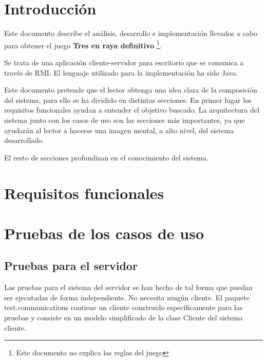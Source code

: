 \documentclass[a4paper,11pt,oneside]{article}
\begin{document}

\clearpage
\section{Introducción}

Este documento describe el análisis, desarrollo e implementación llevados a cabo para obtener
el juego \textbf{Tres en raya definitivo} \footnote{Este documento no explica las reglas del juego}.

Se trata de una aplicación cliente-servidor para escritorio que se comunica a través de RMI.
El lenguaje utilizado para la implementación ha sido Java.

Este documento pretende que el lector obtenga una idea clara de la composición del sistema, para ello
se ha dividido en distintas secciones. En primer lugar los requisitos funcionales ayudan a entender el objetivo
buscado. La arquitectura del sistema junto con los casos de uso son las secciones más importantes, ya
que ayudarán al lector a hacerse una imagen mental, a alto nivel, del sistema desarrollado.

El resto de secciones profundizan en el conocimiento del sistema.

\clearpage

\pagestyle{fancy}

\section{Requisitos funcionales}
 
%
\clearpage
\fancyhf{}

\setcounter{page}{\value{page}}
\clearpage
\lhead{\nouppercase{\leftmark}}
\chead{}
\rhead{}
\setcounter{section}{7}
\section{Pruebas de los casos de uso}

\subsection{Pruebas para el servidor}

Las pruebas para el sistema del servidor se han hecho de tal forma que puedan ser ejecutadas de forma independiente. No necesita ningún cliente. El paquete test.communications contiene un cliente construido específicamente para las pruebas y consiste en un modelo simplificado de la clase Cliente del sistema cliente.
\end{document}
